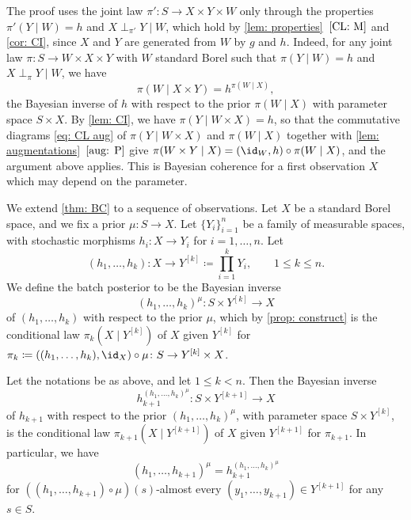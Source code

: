 \documentclass[12pt,reqno]{amsart}%
\theoremstyle{plain}
\theoremstyle{definition}
\begin{document}
\begin{remark}\label{rem: BC}
	The proof uses the joint law $\pi'\colon S\rightarrow X\times Y\times W$ only through the properties
	$\pi'(Y\mid W)=h$ and $X\perp_{\pi'}Y\mid W$,
	which hold by \cref{lem: properties}~$\ref{CL: M}$ and \cref{cor: CI}, since $X$ and $Y$ are generated from $W$ by $g$ and $h$.
	Indeed, for any joint law $\pi\colon S\rightarrow W\times X\times Y$ with $W$ standard Borel
	such that $\pi(Y\mid W)=h$ and $X\perp_\pi Y\mid W$, we have
	\[
		\pi(W\mid X\times Y)=h^{\pi(W\mid X)},
	\]
	the Bayesian inverse of $h$ with respect to the prior $\pi(W\mid X)$ with parameter space $S\times X$.
	By \cref{lem: CI}, we have 
	$\pi(Y\mid W\times X)=h$, so that the commutative diagrams \eqref{eq: CL aug}
	of $\pi(Y\mid W\times X)$ and $\pi(W\mid X)$ together with \cref{lem: augmentations}~$\ref{aug: P}$ give
	$\pi(W\times Y\mid X)=(\id_W,h)\circ\pi(W\mid X)$, and the argument above applies.
	This is Bayesian coherence for a first observation $X$ which may depend on the parameter.
\end{remark}

We extend \cref{thm: BC} to a sequence of observations.
Let $X$ be a standard Borel space, and we fix a prior $\mu\colon S\rightarrow X$.
Let $\{Y_i\}_{i=1}^n$ be a family of measurable
spaces, with stochastic morphisms $h_i\colon X\rightarrow Y_i$ for $i=1,\ldots,n$.
Let
\[
	(h_1,\ldots,h_k)\colon X\rightarrow Y^{[k]}\coloneqq\prod_{i=1}^k Y_i,\qquad 1\leq k\leq n.
\]
We define the batch posterior to be the Bayesian inverse
\[
	(h_1,\ldots,h_k)^\mu\colon S\times Y^{[k]}\rightarrow X
\]
of $(h_1,\ldots,h_k)$ with respect to the prior $\mu$,
which by \cref{prop: construct} is the conditional law $\pi_k(X\mid Y^{[k]})$ of $X$ given $Y^{[k]}$ for
$\pi_k\coloneqq((h_1,\ldots,h_k),\id_X)\circ\mu\colon S\rightarrow Y^{[k]}\times X$.

\begin{corollary}\label{cor: BC}
	Let the notations be as above, and let $1\leq k<n$.
	Then the Bayesian inverse
	\[
		h_{k+1}^{(h_1,\ldots,h_k)^\mu}\colon S\times Y^{[k+1]}\rightarrow X
	\]
	of $h_{k+1}$ with respect to the prior $(h_1,\ldots,h_k)^\mu$, with parameter space $S\times Y^{[k]}$,
	is the conditional law $\pi_{k+1}(X\mid Y^{[k+1]})$ of $X$ given $Y^{[k+1]}$ for $\pi_{k+1}$.  In particular, we have
	\[
		(h_1,\ldots,h_{k+1})^\mu=h_{k+1}^{(h_1,\ldots,h_k)^\mu}
	\]
	for $((h_1,\ldots,h_{k+1})\circ\mu)(s)$-almost every $(y_1,\ldots,y_{k+1})\in Y^{[k+1]}$ for any $s\in S$.
\end{corollary}
\end{document}
